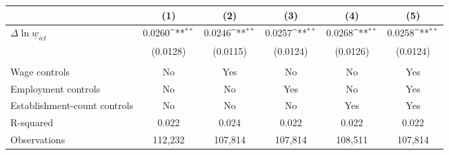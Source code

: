 {
\def\sym#1{\ifmmode^{#1}\else\(^{#1}\)\fi}
\begin{tabular}{l*{5}{c}}
\hline\hline
          &\multicolumn{1}{c}{(1)}         &\multicolumn{1}{c}{(2)}         &\multicolumn{1}{c}{(3)}         &\multicolumn{1}{c}{(4)}         &\multicolumn{1}{c}{(5)}         \\
\hline
$\Delta \ln \underline{w}_{ict}$&   0.0260\sym{**} &   0.0246\sym{**} &   0.0257\sym{**} &   0.0268\sym{**} &   0.0258\sym{**} \\
          & (0.0128)         & (0.0115)         & (0.0124)         & (0.0126)         & (0.0124)         \\
\hline
\vspace{-2mm}&                  &                  &                  &                  &                  \\
Wage controls&       No         &      Yes         &       No         &       No         &      Yes         \\
Employment controls&       No         &       No         &      Yes         &       No         &      Yes         \\
Establishment-count controls&       No         &       No         &       No         &      Yes         &      Yes         \\
R-squared &    0.022         &    0.024         &    0.022         &    0.022         &    0.022         \\
Observations&  112,232         &  107,814         &  107,814         &  108,511         &  107,814         \\
\hline\hline
\end{tabular}
}
